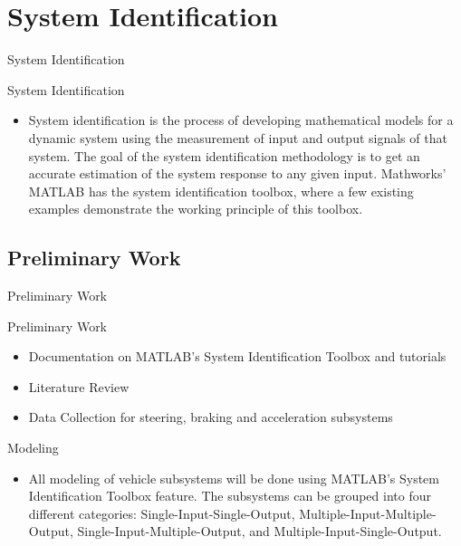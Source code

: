 \documentclass{beamer}
\begin{document}

\section{System Identification}

\begin{frame}{System Identification}
  \begin{block}{System Identification}
 \begin{itemize}
        \item System identification is the process of developing mathematical models for a dynamic system using the measurement of input and output signals of that system. The goal of the system identification methodology is to get an accurate estimation of the system response to any given input. Mathworks' MATLAB has the system identification toolbox, where a few existing examples demonstrate the working principle of this toolbox.
\end{itemize}
  \end{block}
\end{frame}

\subsection{Preliminary Work}

\begin{frame}{Preliminary Work}
  \begin{block}{Preliminary Work}
 \begin{itemize}
        \item Documentation on MATLAB's System Identification Toolbox and tutorials
        \item Literature Review 
        \item Data Collection for steering, braking and acceleration subsystems
\end{itemize}
  \end{block}
  \begin {block}{Modeling}
  \begin{itemize}
  	\item All modeling of vehicle subsystems will be done using MATLAB's System Identification Toolbox feature. The subsystems can be grouped into four different categories: Single-Input-Single-Output, Multiple-Input-Multiple-Output, Single-Input-Multiple-Output, and Multiple-Input-Single-Output. 
  	\end{itemize}
  	\end{block}
\end{frame}
\end{document}
